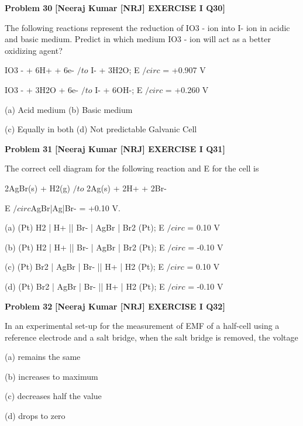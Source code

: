 \begin{problembox}
\textbf{Problem 30} \hfill \textbf{[Neeraj Kumar [NRJ] EXERCISE I Q30]}
\label{q:ext-nrj_all_questions-30}

The following reactions represent the reduction of 
IO3
- ion into I- ion in acidic and basic medium. 
Predict in which medium IO3
- ion will act as a 
better oxidizing agent?
 
 IO3
- + 6H+ + 6e- $/to$ I- + 3H2O; E $/circ$ = +0.907 V
 
 IO3
- + 3H2O + 6e- $/to$ I- + 6OH-; E $/circ$ = +0.260 V
 
 (a) Acid medium 
(b) Basic medium
 
 (c) Equally in both 
(d) Not predictable
Galvanic Cell
\end{problembox}

\begin{problembox}
\textbf{Problem 31} \hfill \textbf{[Neeraj Kumar [NRJ] EXERCISE I Q31]}
\label{q:ext-nrj_all_questions-31}

The correct cell diagram for the following reaction 
and E   for the cell is
 
  2AgBr(s) + H2(g) $/to$ 2Ag(s) + 2H+ + 2Br-
 
  E $/circ$AgBr|Ag|Br- = +0.10 V.
 
 (a)  (Pt) H2 | H+ || Br- | AgBr | Br2 (Pt); E $/circ$ = 0.10 V
 
 (b)  (Pt) H2 | H+ || Br- | AgBr | Br2 (Pt); E $/circ$ = -0.10 V
 
 (c)  (Pt) Br2 | AgBr | Br- || H+ | H2 (Pt); E $/circ$ = 0.10 V
 
 (d)  (Pt) Br2 | AgBr | Br- || H+ | H2 (Pt); E $/circ$ = -0.10 V
\end{problembox}

\begin{problembox}
\textbf{Problem 32} \hfill \textbf{[Neeraj Kumar [NRJ] EXERCISE I Q32]}
\label{q:ext-nrj_all_questions-32}

In an experimental set-up for the measurement of 
EMF of a half-cell using a reference electrode and 
a salt bridge, when the salt bridge is removed, the 
voltage
 
 (a) remains the same
 
 (b) increases to maximum
 
 (c) decreases half the value
 
 (d) drops to zero
\end{problembox}

